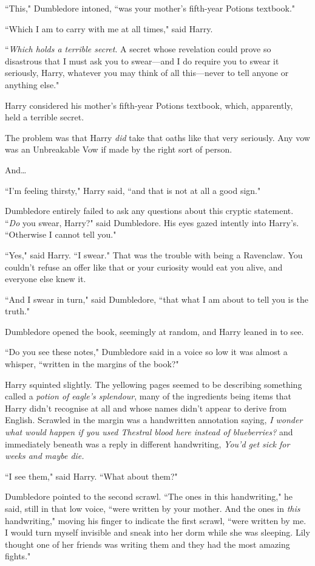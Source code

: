 ``This," Dumbledore intoned, ``was your mother's fifth-year Potions textbook."

``Which I am to carry with me at all times," said Harry.

``\emph{Which holds a terrible secret}. A secret whose revelation could prove so disastrous that I must ask you to swear—and I do require you to swear it seriously, Harry, whatever you may think of all this—never to tell anyone or anything else."

Harry considered his mother's fifth-year Potions textbook, which, apparently, held a terrible secret.

The problem was that Harry \emph{did} take that oaths like that very seriously. Any vow was an Unbreakable Vow if made by the right sort of person.

And…

``I'm feeling thirsty," Harry said, ``and that is not at all a good sign."

Dumbledore entirely failed to ask any questions about this cryptic statement. ``\emph{Do} you swear, Harry?" said Dumbledore. His eyes gazed intently into Harry's. ``Otherwise I cannot tell you."

``Yes," said Harry. ``I swear." That was the trouble with being a Ravenclaw. You couldn't refuse an offer like that or your curiosity would eat you alive, and everyone else knew it.

``And I swear in turn," said Dumbledore, ``that what I am about to tell you is the truth."

Dumbledore opened the book, seemingly at random, and Harry leaned in to see.

``Do you see these notes," Dumbledore said in a voice so low it was almost a whisper, ``written in the margins of the book?"

Harry squinted slightly. The yellowing pages seemed to be describing something called a \emph{potion of eagle's splendour}, many of the ingredients being items that Harry didn't recognise at all and whose names didn't appear to derive from English. Scrawled in the margin was a handwritten annotation saying, \emph{I wonder what would happen if you used Thestral blood here instead of blueberries?} and immediately beneath was a reply in different handwriting, \emph{You'd get sick for weeks and maybe die.}

``I see them," said Harry. ``What about them?"

Dumbledore pointed to the second scrawl. ``The ones in this handwriting," he said, still in that low voice, ``were written by your mother. And the ones in \emph{this} handwriting," moving his finger to indicate the first scrawl, ``were written by me. I would turn myself invisible and sneak into her dorm while she was sleeping. Lily thought one of her friends was writing them and they had the most amazing fights."

